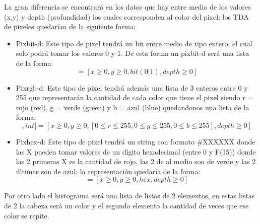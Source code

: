     La gran diferencia se encontrará en los datos que hay entre medio de los valores (x,y) y depth (profundidad)
    los cuales corresponden al color del pixel; los TDA de pixeles quedarían de la siguiente forma:
    \begin{itemize}
        \item Pixbit-d: Este tipo de pixel tendrá un bit entre medio de tipo entero, el cual solo podrá 
        tomar los valores 0 y 1. De esta forma un pixbit-d será una lista de la forma:
        \begin{equation*}
            [int, int, int, int] = [x \geq 0, y \geq 0, bit(0|1), depth \geq 0]
        \end{equation*}
        
        \item Pixrgb-d: Este tipo de pixel tendrá además una lista de 3 enteros entre 0 y 255 que representarán la 
        cantidad de cada color que tiene el pixel siendo r = rojo (red), g = verde (green) y b = azul (blue)
        quedandonos una lista de la forma:
        \begin{equation*}
            [int, int, [int, int, int], int] = [x \geq 0, y \geq 0, [0 \leq r \leq 255, 0 \leq g \leq 255, 0 \leq b \leq 255], depth \geq 0]
        \end{equation*}
        
        \item Pixhex-d: Este tipo de pixel tendrá un string con formato \#XXXXXX donde las X pueden tomar valores de un dígito hexadecimal (entre 0 y F(15))
        donde las 2 primeras X es la cantidad de rojo, las 2 de al medio son de verde y las 2 últimas son de azul; la representación quedaría de la forma:
        \begin{equation*}
            [int, int, string, int] = [x \geq 0, y \geq 0, hex, depth \geq 0]
        \end{equation*}
    \end{itemize}

    Por otro lado el histograma será una lista de listas de 2 elementos, en estas listas de 2 la cabeza será un color
    y el segundo elemento la cantidad de veces que ese color se repite.
